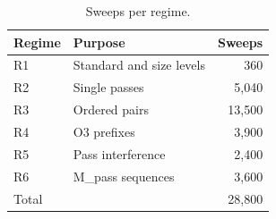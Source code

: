 \begin{table}[t]
\centering
\caption{Sweeps per regime.}
\label{tab:regimes}
\setlength{\tabcolsep}{3pt}
\begin{tabular}{|l|l|r|}
\hline
Regime & Purpose & Sweeps \\
\hline
R1 & Standard and size levels & 360 \\
\hline
R2 & Single passes & 5,040 \\
\hline
R3 & Ordered pairs & 13,500 \\
\hline
R4 & O3 prefixes & 3,900 \\
\hline
R5 & Pass interference & 2,400 \\
\hline
R6 & M\_pass sequences & 3,600 \\
\hline
Total &  & 28,800 \\
\hline
\end{tabular}
\end{table}
